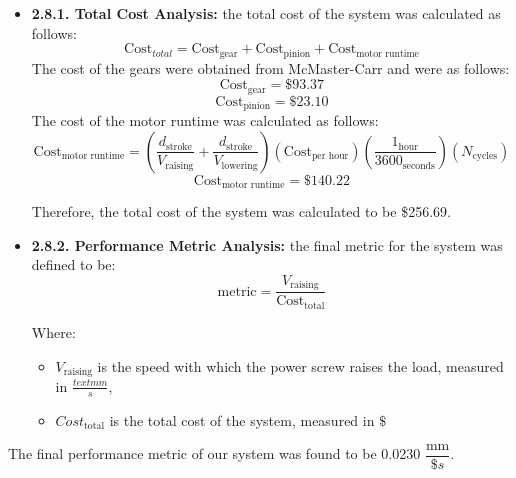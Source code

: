 \documentclass[letterpaper,12pt]{article}
\begin{document}
\begin{itemize}[leftmargin=3mm]
    \item \textbf{2.8.1. Total Cost Analysis:} the total cost of the system was calculated as follows:
    \begin{equation*}
    \text{Cost}_{total} = \text{Cost}_{\text{gear}} + \text{Cost}_{\text{pinion}} + \text{Cost}_{\text{motor runtime}} 
    \end{equation*}
    The cost of the gears were obtained from McMaster-Carr and were as follows:
    \begin{equation*}
    \text{Cost}_{\text{gear}} = \$93.37
    \end{equation*}
    \begin{equation*}
    \text{Cost}_{\text{pinion}} = \$23.10
    \end{equation*}
    The cost of the motor runtime was calculated as follows:
    \begin{equation*}
        \text{Cost}_{\text{motor runtime}} = \left(\frac{d_{\text{stroke}}}{V_{\text{raising}}}+\frac{d_{\text{stroke}}}{V_{\text{lowering}}}\right)\left(\text{Cost}_{\text{per hour}}\right)\left(\frac{1_{\text{hour}}}{3600_{\text{seconds}}}\right)\left(N_{\text{cycles}}\right)
    \end{equation*}
    \begin{equation}
        \text{Cost}_{\text{motor runtime}} = \$140.22
    \end{equation}
    
    Therefore, the total cost of the system was calculated to be \$256.69.
    \\
    \item \textbf{2.8.2. Performance Metric Analysis:}
    the final metric for the system was defined to be:
    \begin{equation}
        \text{metric} = \frac{V_{\text{raising}}}{\text{Cost}_{\text{total}}}
    \end{equation}
    
    Where: 
    \begin{itemize}
        \item $V_{\text{raising}}$ is the speed with which the power screw raises the load, measured in $\frac{text{mm}}{s}$,
        \item $Cost_{\text{total}}$ is the total cost of the system, measured in $\$$
    \end{itemize}
\end{itemize}
The final performance metric of our system was found to be 0.0230 $\dfrac{\text{mm}}{\$s}$.
\end{document}
